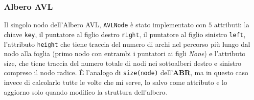 \subsubsection*{Albero AVL}
Il singolo nodo dell'Albero AVL, \texttt{AVLNode} è stato implementato con $5$ attributi: la chiave \texttt{key}, il puntatore al figlio destro \texttt{right}, il puntatore al figlio sinistro \texttt{left}, l'attributo \texttt{height} che tiene traccia del numero di archi nel percorso più lungo dal nodo alla foglia (primo nodo con entrambi i puntatori ai figli \textit{None}) e l'attributo size, che tiene traccia del numero totale di nodi nei sottoalberi destro e sinistro compreso il nodo radice. È l'analogo di \texttt{size(node)} dell'\textbf{ABR}, ma in questo caso invece di calcolarlo tutte le volte che mi serve, lo salvo come attributo e lo aggiorno solo quando modifico la struttura dell'albero.

